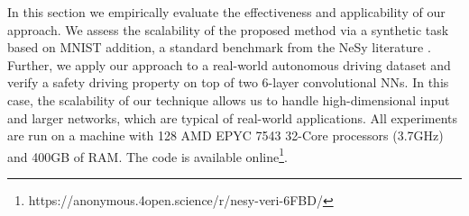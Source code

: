 


In this section we empirically evaluate the effectiveness and applicability of our approach. We assess the scalability of the proposed method via a synthetic task based on MNIST addition, a standard benchmark from the NeSy literature \cite{manhaeve2018deepproblog}. Further, we apply our approach to a real-world autonomous driving dataset and verify a safety driving property on top of two 6-layer convolutional NNs. In this case, the scalability of our technique allows us to handle high-dimensional input and larger networks, which are typical of real-world applications. All experiments are run on a machine with 128 AMD EPYC 7543 32-Core processors (3.7GHz) and 400GB of RAM. The code is available online\footnote{https://anonymous.4open.science/r/nesy-veri-6FBD/}.